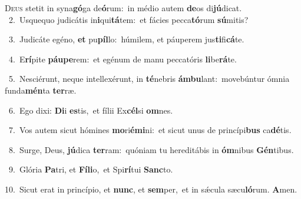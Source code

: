 \lettrine{\initial\textcolor{\initialcolor}{D}}{eus} stetit in syna\-\textbf{gó}\-ga de\-\textbf{ó}\-rum:~\star in médio autem \textbf{de}\-os di\-\textbf{jú}\-dicat.\\
{\numbfont\textcolor{\numbcolor}{~2.}}~Usquequo judicátis in\-\textbf{i}\-qui\-\textbf{tá}\-tem:~\star et fácies pecca\-\textbf{tó}\-rum \textbf{sú}\-mitis?\par
{\numbfont\textcolor{\numbcolor}{~3.}}~Judicáte egéno, \textbf{et} pu\-\textbf{píl}\-lo:~\star húmilem, et páuperem jus\-\textbf{ti}\-fi\-\textbf{cá}\-te.\par
{\numbfont\textcolor{\numbcolor}{~4.}}~E\-\textbf{rí}\-pite \textbf{páu}\-\textbf{pe}rem:~\star et egénum de manu peccatóris \textbf{li}\-be\-\textbf{rá}\-te.\par
{\numbfont\textcolor{\numbcolor}{~5.}}~Nesciérunt, neque intellexérunt, in \textbf{té}\-nebris \textbf{ám}\-\textbf{bu}lant:~\star movebúntur ómnia funda\-\textbf{mén}\-ta \textbf{ter}\-ræ.\par
{\numbfont\textcolor{\numbcolor}{~6.}}~Ego dixi: \textbf{Di}\-i \textbf{es}\-tis,~\star et fílii Ex\-\textbf{cél}\-si \textbf{om}\-nes.\par
{\numbfont\textcolor{\numbcolor}{~7.}}~Vos autem sicut hómines \textbf{mo}\-ri\-\textbf{é}\-\textbf{mi}ni:~\star et sicut unus de princípi\textbf{bus} ca\-\textbf{dé}\-tis.\par
{\numbfont\textcolor{\numbcolor}{~8.}}~Surge, Deus, \textbf{jú}\-dica \textbf{ter}\-ram:~\star quóniam tu hereditábis in \textbf{óm}\-nibus \textbf{Gén}\-tibus.\par
{\numbfont\textcolor{\numbcolor}{~9.}}~Glória \textbf{Pa}\-tri, et \textbf{Fí}\-\textbf{li}o,~\star et Spi\-\textbf{rí}\-tui \textbf{Sanc}\-to.\par
{\numbfont\textcolor{\numbcolor}{10.}}~Sicut erat in princípio, et \textbf{nunc}\-, et \textbf{sem}\-per,~\star et in sǽcula sæcu\-\textbf{ló}\-rum. \textbf{A}\-men.\par
